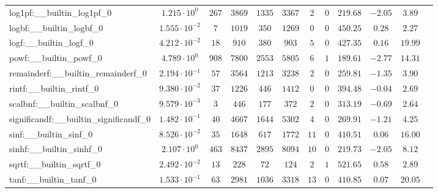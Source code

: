 \begin{tabular}{|l|c|c|c|c|c|c|c|c|c|c|c|}
log1pf:\_\_builtin\_log1pf\_0             & $ 1.215 \cdot 10^{0}  $ & $ 267    $ & $ 3869   $ & $ 1335  $ & $ 3367   $ & $ 2   $ & $ 0 $ & $ 219.68      $ & $ -2.05   $ & $ 3.89    $ \\
logbf:\_\_builtin\_logbf\_0               & $ 1.555 \cdot 10^{-2} $ & $ 7      $ & $ 1019   $ & $ 350   $ & $ 1269   $ & $ 0   $ & $ 0 $ & $ 450.25      $ & $ 0.28    $ & $ 2.27    $ \\
logf:\_\_builtin\_logf\_0                 & $ 4.212 \cdot 10^{-2} $ & $ 18     $ & $ 910    $ & $ 380   $ & $ 903    $ & $ 5   $ & $ 0 $ & $ 427.35      $ & $ 0.16    $ & $ 19.99   $ \\
powf:\_\_builtin\_powf\_0                 & $ 4.789 \cdot 10^{0}  $ & $ 908    $ & $ 7800   $ & $ 2553  $ & $ 5805   $ & $ 6   $ & $ 1 $ & $ 189.61      $ & $ -2.77   $ & $ 14.31   $ \\
remainderf:\_\_builtin\_remainderf\_0     & $ 2.194 \cdot 10^{-1} $ & $ 57     $ & $ 3564   $ & $ 1213  $ & $ 3238   $ & $ 2   $ & $ 0 $ & $ 259.81      $ & $ -1.35   $ & $ 3.90    $ \\
rintf:\_\_builtin\_rintf\_0               & $ 9.380 \cdot 10^{-2} $ & $ 37     $ & $ 1226   $ & $ 446   $ & $ 1412   $ & $ 0   $ & $ 0 $ & $ 394.48      $ & $ -0.04   $ & $ 2.69    $ \\
scalbnf:\_\_builtin\_scalbnf\_0           & $ 9.579 \cdot 10^{-3} $ & $ 3      $ & $ 446    $ & $ 177   $ & $ 372    $ & $ 2   $ & $ 0 $ & $ 313.19      $ & $ -0.69   $ & $ 2.64    $ \\
significandf:\_\_builtin\_significandf\_0 & $ 1.482 \cdot 10^{-1} $ & $ 40     $ & $ 4667   $ & $ 1644  $ & $ 5302   $ & $ 4   $ & $ 0 $ & $ 269.91      $ & $ -1.21   $ & $ 4.25    $ \\
sinf:\_\_builtin\_sinf\_0                 & $ 8.526 \cdot 10^{-2} $ & $ 35     $ & $ 1648   $ & $ 617   $ & $ 1772   $ & $ 11  $ & $ 0 $ & $ 410.51      $ & $ 0.06    $ & $ 16.00   $ \\
sinhf:\_\_builtin\_sinhf\_0               & $ 2.107 \cdot 10^{0}  $ & $ 463    $ & $ 8437   $ & $ 2895  $ & $ 8094   $ & $ 10  $ & $ 0 $ & $ 219.73      $ & $ -2.05   $ & $ 8.12    $ \\
sqrtf:\_\_builtin\_sqrtf\_0               & $ 2.492 \cdot 10^{-2} $ & $ 13     $ & $ 228    $ & $ 72    $ & $ 124    $ & $ 2   $ & $ 1 $ & $ 521.65      $ & $ 0.58    $ & $ 2.89    $ \\
tanf:\_\_builtin\_tanf\_0                 & $ 1.533 \cdot 10^{-1} $ & $ 63     $ & $ 2981   $ & $ 1036  $ & $ 3318   $ & $ 13  $ & $ 0 $ & $ 410.85      $ & $ 0.07    $ & $ 20.05   $ \\

\end{tabular}
